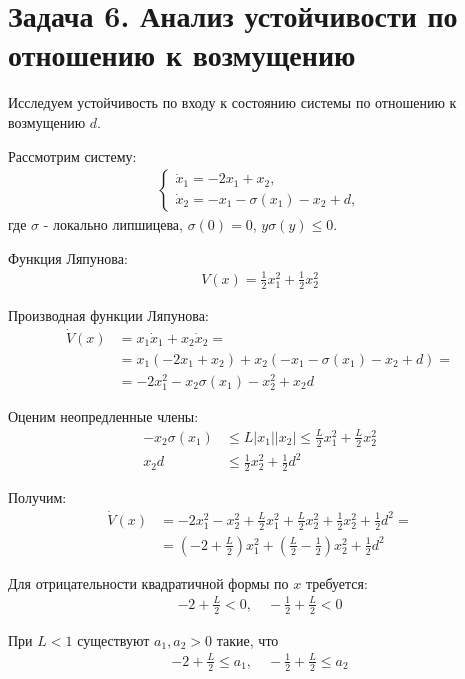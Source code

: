 \section*{Задача 6. Анализ устойчивости по отношению к возмущению}

Исследуем устойчивость по входу к состоянию системы по отношению к возмущению $d$.

Рассмотрим систему:
\begin{align*}
    \begin{cases}
        \dot{x}_1 = -2x_1 + x_2, \\
        \dot{x}_2 = -x_1 - \sigma(x_1) - x_2 + d,
    \end{cases}
\end{align*}
где $\sigma$ - локально липшицева, $\sigma(0)=0$, $y\sigma(y) \le 0$.

Функция Ляпунова:
\begin{align*}
    V(x) = \frac{1}{2}x_1^2 + \frac{1}{2}x_2^2
\end{align*}

Производная функции Ляпунова:
\begin{align*}
    \dot{V}(x) &= x_1 \dot{x}_1 + x_2 \dot{x}_2 = \\
    &= x_1(-2x_1 + x_2) + x_2(-x_1 - \sigma(x_1) - x_2 + d) = \\
    &= -2x_1^2 - x_2\sigma(x_1) - x_2^2 + x_2d
\end{align*}

Оценим неопредленные члены:
\begin{align*}
    -x_2\sigma(x_1) &\le L|x_1||x_2| \le \frac{L}{2} x_1^2 + \frac{L}{2} x_2^2 \\
    x_2d &\le \frac{1}{2} x_2^2 + \frac{1}{2} d^2
\end{align*}

Получим:
\begin{align*}
    \dot{V}(x) &= -2x_1^2 - x_2^2 + \frac{L}{2} x_1^2 + \frac{L}{2} x_2^2 + \frac{1}{2} x_2^2 + \frac{1}{2} d^2 = \\
    &= \left(-2 + \frac{L}{2} \right)x_1^2 + \left(\frac{L}{2} - \frac{1}{2} \right) x_2^2 + \frac{1}{2} d^2
\end{align*}

Для отрицательности квадратичной формы по $x$ требуется:
\begin{align*}
    -2 + \frac{L}{2} < 0, \quad
    -\frac{1}{2} + \frac{L}{2} < 0
\end{align*}

При $L<1$ существуют $a_1, a_2 > 0$ такие, что
\begin{align*}
    -2 + \frac{L}{2} \le a_1, \quad
    -\frac{1}{2} + \frac{L}{2} \le a_2
\end{align*}


